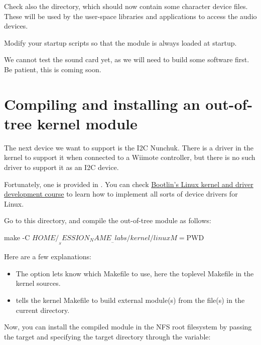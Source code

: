 Check also the  directory, which should now contain
some character device files. These will be used by the user-space
libraries and applications to access the audio devices.

Modify your startup scripts so that the  module
is always loaded at startup.

We cannot test the sound card yet, as we will need to build some
software first. Be patient, this is coming soon.

\section{Compiling and installing an out-of-tree kernel module}

The next device we want to support is the I2C Nunchuk. There is a driver
in the kernel to support it when connected to a Wiimote controller, but
there is no such driver to support it as an I2C device.

Fortunately, one is provided in
. You can check
\href{https://bootlin.com/training/kernel/}{Bootlin's Linux kernel and
driver development course} to learn how to implement all sorts of device
drivers for Linux.

Go to this directory, and compile the out-of-tree module as follows:

\begin{bashinput}
make -C $HOME/__SESSION_NAME__-labs/kernel/linux M=$PWD
\end{bashinput}

Here are a few explanations:
\begin{itemize}
\item The  option lets  know which Makefile to
      use, here the toplevel Makefile in the kernel sources.
\item {} tells the kernel Makefile to build external
      module(s) from the file(s) in the current directory.
\end{itemize}

Now, you can install the compiled module in the NFS root filesystem
by passing the  target and specifying the
target directory through the  variable:


